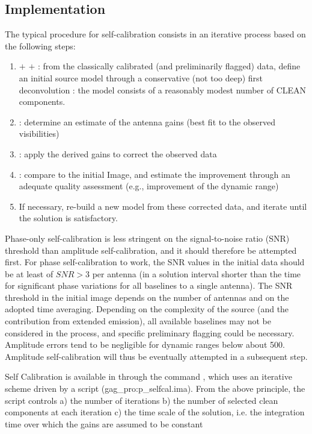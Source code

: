 \subsection{Implementation}

The typical procedure for self-calibration consists in an iterative 
process based on the following steps:
\begin{enumerate}\itemsep 0pt
\item {} $+$  $+$ 
: from the classically calibrated (and 
preliminarily flagged) data, define an initial source model through a 
conservative (not too deep) first deconvolution : the model consists of 
a reasonably modest number of CLEAN components.
\item {}: determine an estimate of the antenna gains (best fit 
to the observed visibilities)
\item {}: apply the derived gains to correct the observed data
\item {}: compare to the initial Image, and estimate the 
improvement through an adequate quality assessment (e.g., improvement 
of the dynamic range)
\item If necessary, re-build a new model from these corrected data, and 
iterate until the solution is satisfactory.
\end{enumerate}

Phase-only self-calibration is less stringent on the signal-to-noise 
ratio (SNR) threshold than amplitude self-calibration, and it should 
therefore be attempted first. For phase self-calibration to work, the 
SNR values in the initial data should be at least of $SNR > 3$ per 
antenna (in a solution interval shorter than the time for significant 
phase variations for all baselines to a single antenna). The SNR 
threshold in the initial image depends on the number of antennas and on 
the adopted time averaging. Depending on the complexity of the source 
(and the contribution from extended emission), all available baselines 
may not be considered in the process, and specific preliminary flagging 
could be necessary. Amplitude errors tend to be negligible for dynamic 
ranges below about 500. Amplitude self-calibration will thus 
be eventually attempted in a subsequent step.

Self Calibration is available in \imager{} through the command 
, which uses an iterative scheme driven by a script 
(gag\_pro:p\_selfcal.ima).  From the above principle, the script 
controls
  a) the number of iterations
  b) the number of selected clean components at each iteration
  c) the time scale of the solution, i.e. the integration time
  over which the gains are assumed to be constant

